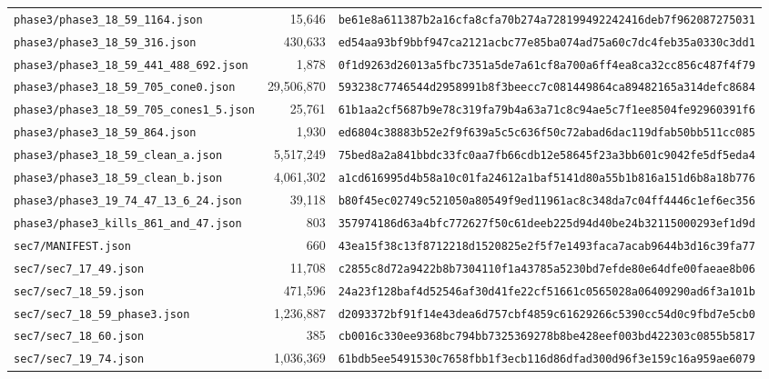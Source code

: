 \documentclass[11pt,reqno]{amsart}
\theoremstyle{definition}
\theoremstyle{remark}
\numberwithin{equation}{section}
\numberwithin{table}{section}
\begin{document}
{\begin{longtable}{@{}>{\raggedright\arraybackslash}p{1.90in}r>{\raggedright\arraybackslash}p{3.35in}@{}}
\nolinkurl{phase3/phase3_18_59_1164.json} & 15,646 & \nolinkurl{be61e8a611387b2a16cfa8cfa70b274a728199492242416deb7f962087275031} \\
\nolinkurl{phase3/phase3_18_59_316.json} & 430,633 & \nolinkurl{ed54aa93bf9bbf947ca2121acbc77e85ba074ad75a60c7dc4feb35a0330c3dd1} \\
\nolinkurl{phase3/phase3_18_59_441_488_692.json} & 1,878 & \nolinkurl{0f1d9263d26013a5fbc7351a5de7a61cf8a700a6ff4ea8ca32cc856c487f4f79} \\
\nolinkurl{phase3/phase3_18_59_705_cone0.json} & 29,506,870 & \nolinkurl{593238c7746544d2958991b8f3beecc7c081449864ca89482165a314defc8684} \\
\nolinkurl{phase3/phase3_18_59_705_cones1_5.json} & 25,761 & \nolinkurl{61b1aa2cf5687b9e78c319fa79b4a63a71c8c94ae5c7f1ee8504fe92960391f6} \\
\nolinkurl{phase3/phase3_18_59_864.json} & 1,930 & \nolinkurl{ed6804c38883b52e2f9f639a5c5c636f50c72abad6dac119dfab50bb511cc085} \\
\nolinkurl{phase3/phase3_18_59_clean_a.json} & 5,517,249 & \nolinkurl{75bed8a2a841bbdc33fc0aa7fb66cdb12e58645f23a3bb601c9042fe5df5eda4} \\
\nolinkurl{phase3/phase3_18_59_clean_b.json} & 4,061,302 & \nolinkurl{a1cd616995d4b58a10c01fa24612a1baf5141d80a55b1b816a151d6b8a18b776} \\
\nolinkurl{phase3/phase3_19_74_47_13_6_24.json} & 39,118 & \nolinkurl{b80f45ec02749c521050a80549f9ed11961ac8c348da7c04ff4446c1ef6ec356} \\
\nolinkurl{phase3/phase3_kills_861_and_47.json} & 803 & \nolinkurl{357974186d63a4bfc772627f50c61deeb225d94d40be24b32115000293ef1d9d} \\
\nolinkurl{sec7/MANIFEST.json} & 660 & \nolinkurl{43ea15f38c13f8712218d1520825e2f5f7e1493faca7acab9644b3d16c39fa77} \\
\nolinkurl{sec7/sec7_17_49.json} & 11,708 & \nolinkurl{c2855c8d72a9422b8b7304110f1a43785a5230bd7efde80e64dfe00faeae8b06} \\
\nolinkurl{sec7/sec7_18_59.json} & 471,596 & \nolinkurl{24a23f128baf4d52546af30d41fe22cf51661c0565028a06409290ad6f3a101b} \\
\nolinkurl{sec7/sec7_18_59_phase3.json} & 1,236,887 & \nolinkurl{d2093372bf91f14e43dea6d757cbf4859c61629266c5390cc54d0c9fbd7e5cb0} \\
\nolinkurl{sec7/sec7_18_60.json} & 385 & \nolinkurl{cb0016c330ee9368bc794bb7325369278b8be428eef003bd422303c0855b5817} \\
\nolinkurl{sec7/sec7_19_74.json} & 1,036,369 & \nolinkurl{61bdb5ee5491530c7658fbb1f3ecb116d86dfad300d96f3e159c16a959ae6079} \\

\end{longtable}}
\end{document}
